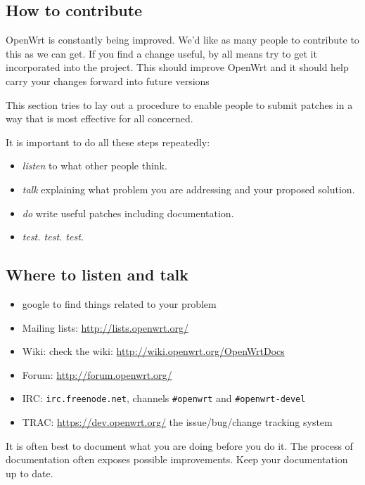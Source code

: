 \subsection{How to contribute}
OpenWrt is constantly being improved.  We'd like as many people to contribute
to this as we can get. If you find a change useful, by all means try to get
it incorporated into the project. This should improve OpenWrt and it should
help carry your changes forward into future versions

This section tries to lay out a procedure to enable people to submit patches
in a way that is most effective for all concerned.

It is important to do all these steps repeatedly:

\begin{itemize}
	\item \textit{listen} to what other people think.
	\item \textit{talk} explaining what problem you are addressing and your
		proposed solution.
	\item \textit{do} write useful patches including documentation.
    \item \textit{test. test. test.}
\end{itemize}

\subsection{Where to listen and talk}

\begin{itemize}
	\item google to find things related to your problem
	\item Mailing lists: \href{http://lists.openwrt.org/}{http://lists.openwrt.org/}
	\item Wiki: check the wiki: \href{http://wiki.openwrt.org/OpenWrtDocs}{http://wiki.openwrt.org/OpenWrtDocs}
	\item Forum: \href{http://forum.openwrt.org/}{http://forum.openwrt.org/}
	\item IRC: \texttt{irc.freenode.net}, channels \texttt{\#openwrt} and 
		\texttt{\#openwrt-devel}
	\item TRAC: \href{https://dev.openwrt.org/}{https://dev.openwrt.org/} the issue/bug/change tracking system
\end{itemize}

It is often best to document what you are doing before you do it.  The process
of documentation often exposes possible improvements.  Keep your documentation
up to date.

